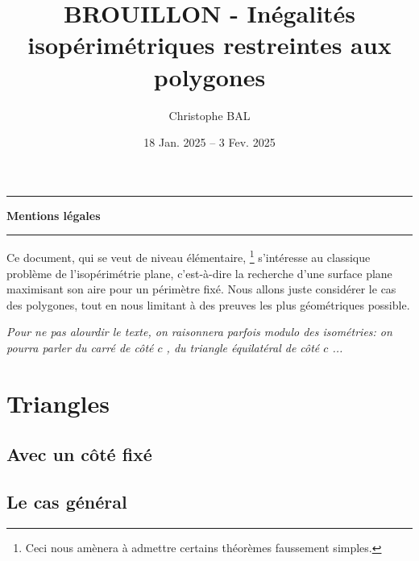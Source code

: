 \documentclass[12pt]{amsart}
\begin{document}
\title{BROUILLON - Inégalités isopérimétriques restreintes aux polygones}
\author{Christophe BAL}
\date{18 Jan. 2025 -- 3 Fev. 2025}
\maketitle


\begin{center}
	\hrule\vspace{.3em}
	{
		\fontsize{1.35em}{1em}\selectfont
		\textbf{Mentions \og légales \fg}
	}
			
	\vspace{0.45em}
	\doclicenseThis
	\hrule
\end{center}



\setcounter{tocdepth}{2}
\tableofcontents




\newpage

Ce document, qui se veut de niveau élémentaire,%
\footnote{
	Ceci nous amènera à admettre certains théorèmes faussement simples.
}
s'intéresse au classique problème de l'isopérimétrie plane, c'est-à-dire la recherche d'une surface plane maximisant son aire pour un périmètre fixé.
Nous allons juste considérer le cas des polygones, tout en nous limitant à des preuves les plus géométriques possible.


\begin{tcolorbox}
	\itshape\small
	Pour ne pas alourdir le texte, on raisonnera parfois modulo des isométries: on pourra parler \og \emph{du carré de côté $c$} \fg\kern-2pt, \og \emph{du triangle équilatéral de côté $c$} \fg\kern-2pt...
\end{tcolorbox}




\section{Triangles}

\subsection{Avec un côté fixé}



\subsection{Le cas général}

\end{document}
